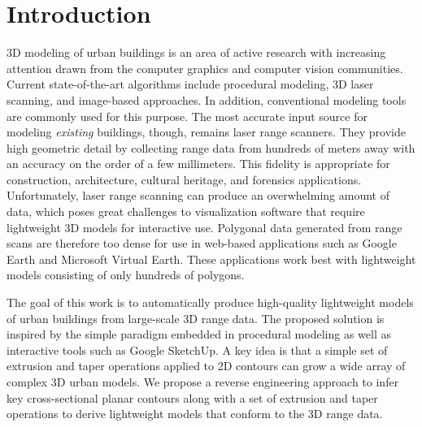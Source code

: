 \documentclass[10pt,journal,cspaper,compsoc]{IEEEtran}
\begin{document}
\maketitle
\IEEEdisplaynotcompsoctitleabstractindextext


%
\IEEEpeerreviewmaketitle

\section{Introduction}
3D modeling of urban buildings is an area of active research
with increasing attention drawn from the computer graphics and
computer vision communities.
Current state-of-the-art algorithms include procedural modeling,
3D laser scanning, and image-based approaches.
In addition, conventional modeling tools are commonly used for this purpose.
The most accurate input source for modeling {\it existing} buildings, though,
remains laser range scanners.
They provide high geometric detail by collecting range data from hundreds
of meters away with an accuracy on the order of a few millimeters.
This fidelity is appropriate for construction, architecture, cultural
heritage, and forensics applications.
Unfortunately, laser range scanning can produce an overwhelming amount of data,
which poses great challenges to visualization software that require lightweight
3D models for interactive use.
Polygonal data generated from range scans are therefore too dense for use in
web-based applications such as Google Earth and Microsoft Virtual Earth.
These applications work best with lightweight models consisting of only
hundreds of polygons.

The goal of this work is to automatically produce high-quality
lightweight models of urban buildings from large-scale 3D range data.
The proposed solution is inspired by the simple paradigm embedded in
procedural modeling as well as interactive tools such as Google SketchUp.
A key idea is that a simple set of extrusion and taper
operations applied to 2D contours can grow a wide array of complex 3D urban
models.
We propose a reverse engineering approach to infer key cross-sectional
planar contours along with a set of extrusion and taper operations to derive
lightweight models that conform to the 3D range data.
\end{document}
